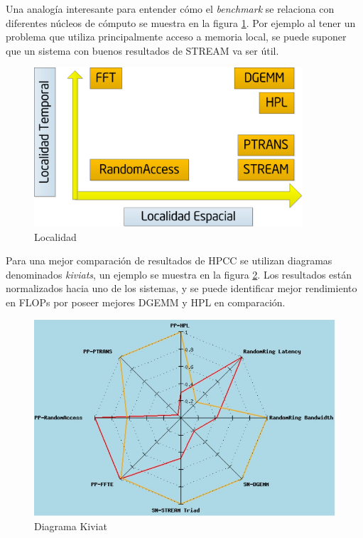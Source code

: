 \documentclass[a4paper]{report}
\begin{document}
\bigskip

Una analogía interesante para entender cómo el {\it benchmark} se relaciona con diferentes núcleos de cómputo se muestra en la figura \ref{fig:locality}. Por ejemplo al tener un problema que utiliza principalmente acceso a memoria local, se puede suponer que un sistema con buenos resultados de STREAM va ser útil.

\bigskip

\begin{figure}[H]
\begin{center}
\includegraphics[width=10cm]{locality.png}
\caption{Localidad}
\label{fig:locality}
\end{center}
\end{figure}

\bigskip

Para una mejor comparación de resultados de HPCC se utilizan diagramas
denominados {\it kiviats}, un ejemplo se muestra en la figura \ref{fig:kiviat}.
Los resultados están normalizados hacia uno de los sistemas, y se puede identificar mejor rendimiento en FLOPs por poseer mejores DGEMM y HPL en comparación.

\begin{figure}[H]
\begin{center}
\includegraphics[width=12cm]{kiviat.png}
\caption{Diagrama Kiviat}
\label{fig:kiviat}
\end{center}
\end{figure}
\end{document}
